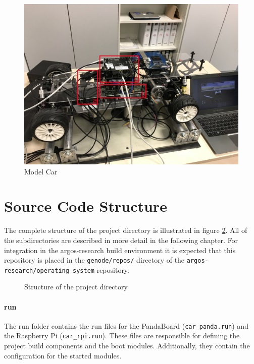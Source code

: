 \begin{figure}[h]
       \centering
       \includegraphics[trim={0 10cm 0 30cm},clip,width=1.0\linewidth]{images/model}
       \caption{Model Car}
       \label{fig:model}
\end{figure}




\section{Source Code Structure}
\label{sec:scs}
The complete structure of the project directory is illustrated in figure \ref{fig:structure}. All of the subdirectories are described in more detail in the following chapter.
For integration in the argos-research build environment it is expected that this repository is placed in the \texttt{genode/repos/} directory of the \texttt{argos-research/operating-system} repository. \\

\begin{figure}[h]
    \caption{Structure of the project directory}
    \label{fig:structure}
\end{figure}


\paragraph{run}
The run folder contains the run files for the PandaBoard (\texttt{car\_panda.run}) and the Raspberry Pi (\texttt{car\_rpi.run}).
These files are responsible for defining the project build components and the boot modules. Additionally, they contain the configuration for the started modules.

